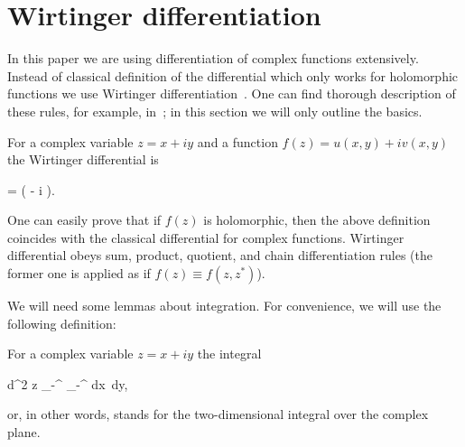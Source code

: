 \section{Wirtinger differentiation}

In this paper we are using differentiation of complex functions extensively.
Instead of classical definition of the differential which only works for holomorphic functions we use Wirtinger differentiation~\cite{Wirtinger1927}.
One can find thorough description of these rules, for example, in~\cite{Kreutz-Delgado2009}; in this section we will only outline the basics.

\begin{definition}
	For a complex variable $z = x + iy$ and a function $f(z) = u(x, y) + iv(x, y)$ the Wirtinger differential is
	\begin{eqn*}
		=  \left(
			 - i 
		\right).
	\end{eqn*}
\end{definition}

One can easily prove that if $f(z)$ is holomorphic, then the above definition coincides with the classical differential for complex functions.
Wirtinger differential obeys sum, product, quotient, and chain differentiation rules (the former one is applied as if $f(z) \equiv f(z, z^*)$).

We will need some lemmas about integration.
For convenience, we will use the following definition:

\begin{definition}
	For a complex variable $z = x + iy$ the integral
	\begin{eqn*}
		\int d^2 z \equiv \int_{-\infty}^{\infty} \int_{-\infty}^{\infty} dx\, dy,
	\end{eqn*}
	or, in other words, stands for the two-dimensional integral over the complex plane.
\end{definition}

